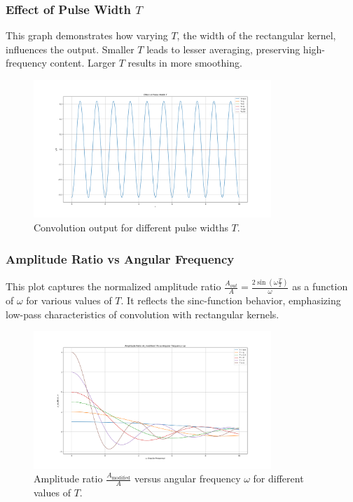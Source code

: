 \subsubsection{Effect of Pulse Width \( T \)}

This graph demonstrates how varying \( T \), the width of the rectangular kernel, influences the output. Smaller \( T \) leads to lesser averaging, preserving high-frequency content. Larger \( T \) results in more smoothing.
\begin{figure}[h]
    \centering
    \includegraphics[width=0.8\textwidth]{codes/codes_sin_2/figs/T.png}
    \caption{Convolution output for different pulse widths \( T \).}
\end{figure}

\subsubsection{Amplitude Ratio vs Angular Frequency}

This plot captures the normalized amplitude ratio \( \frac{A_{out}}{A} = \frac{2\sin(\omega \frac{T}{2})}{\omega} \) as a function of \( \omega \) for various values of \( T \). It reflects the sinc-function behavior, emphasizing low-pass characteristics of convolution with rectangular kernels.
\begin{figure}[h]
    \centering
    \includegraphics[width=0.8\textwidth]{codes/codes_sin_2/figs/scaling.png}
    \caption{Amplitude ratio \( \frac{A_{\text{modified}}}{A} \) versus angular frequency \( \omega \) for different values of \( T \).}
\end{figure}

